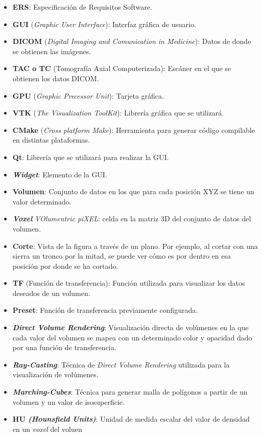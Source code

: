 	\begin{itemize}
		\item \textbf{ERS}: Especificación de Requisitos Software.
		\item \textbf{GUI} (\textit{Graphic User Interface}): Interfaz gráfica de usuario.
		\item \textbf{DICOM} (\textit{Digital Imaging and Comunication in Medicine}): Datos de donde se obtienen las imágenes.
		\item \textbf{TAC o TC} (Tomografía Axial Computerizada): Escáner en el que se obtienen los datos DICOM.
		\item \textbf{GPU} (\textit{Graphic Precessor Unit}): Tarjeta gráfica.
		\item \textbf{VTK} (\textit{The Visualization ToolKit}): Librería gráfica que se utilizará.
		\item \textbf{CMake} (\textit{Cross platform Make}): Herramienta para generar código compilable en distintas plataformas.
		\item \textbf{Qt}: Librería que se utilizará para realizar la GUI.
		\item \textbf{\textit{Widget}}: Elemento de la GUI.
		\item \textbf{Volumen}: Conjunto de datos en los que para cada posición XYZ se tiene un valor determinado.
		\item \textbf{\textit{Voxel}} \textit{VOlumentric piXEL}: celda en la matriz 3D del conjunto de datos del volumen.
		\item \textbf{Corte}: Vista de la figura a través de un plano. Por ejemplo, al cortar con una sierra un tronco por la mitad, se puede ver cómo es por dentro en esa posición por donde se ha cortado.
		\item \textbf{TF} (Función de transferencia): Función utilizada para visualizar los datos deseados de un volumen.
		\item \textbf{Preset}: Función de transferencia previamente configurada.
		\item \textbf{\textit{Direct Volume Rendering}}: Visualización directa de volúmenes en la que cada valor del volumen se mapea con un determinado color y opacidad dado por una función de transferencia.
		\item \textbf{\textit{Ray-Casting}}: Técnica de \textit{Direct Volume Rendering} utilizada para la visualización de volúmenes.
		\item \textbf{\textit{Marching-Cubes}}: Técnica para generar malla de polígonos a partir de un volumen y un valor de isosuperficie.
		\item \textbf{HU \textit{(Hounsfield Units)}}: Unidad de medida escalar del valor de densidad en un \textit{voxel} del voluen
	\end{itemize}
	
